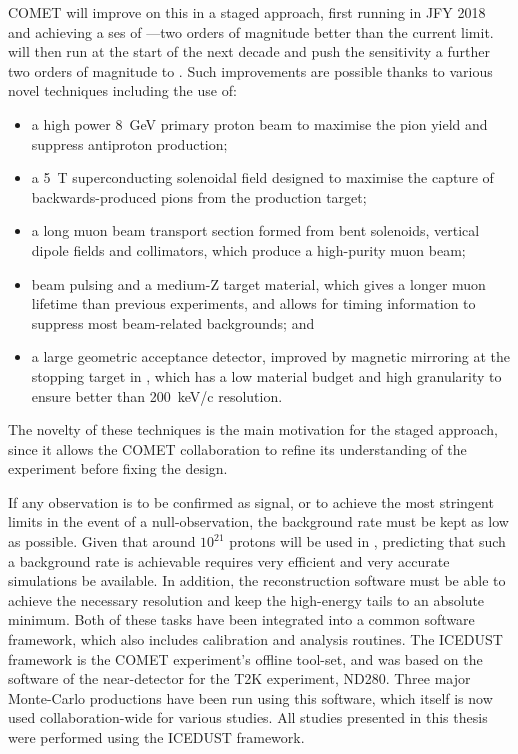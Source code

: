 COMET will improve on this in a staged approach, first running in \ac{JFY} 2018 and achieving a \ac{ses} of \sensePI---two orders of magnitude better than the current limit.
\phaseII will then run at the start of the next decade and push the sensitivity a further two orders of magnitude to \sensePII.
Such improvements are possible thanks to various novel techniques including the use of: 
\begin{itemize}
\item a high power 8~GeV primary proton beam to maximise the pion yield and suppress antiproton production;
\item a 5~T superconducting solenoidal field designed to maximise the capture of backwards-produced pions from the production target;
\item a long muon beam transport section formed from bent solenoids, vertical dipole fields and collimators, which produce a high-purity muon beam;
\item beam pulsing and a medium-Z target material, which gives a longer muon lifetime than previous experiments, and allows for timing information to suppress most beam-related backgrounds; and
\item a large geometric acceptance detector, improved by magnetic mirroring at the stopping target in \phaseII, which has a low material budget and high granularity to ensure better than 200~keV/c resolution.
\end{itemize}
The novelty of these techniques is the main motivation for the staged approach, since it allows the COMET collaboration to refine its understanding of the experiment before fixing the \phaseII design.

If any observation is to be confirmed as signal, or to achieve the most stringent limits in the event of a null-observation, the background rate must be kept as low as possible.
Given that around $10^{21}$ protons will be used in \phaseII, predicting that such a background rate is achievable requires very efficient and very accurate simulations be available.
In addition, the reconstruction software must be able to achieve the necessary resolution and keep the high-energy tails to an absolute minimum.
Both of these tasks have been integrated into a common software framework, which also includes calibration and analysis routines.
The ICEDUST framework is the COMET experiment's offline tool-set, and was based on the software of the near-detector for the T2K experiment, ND280.
Three major Monte-Carlo productions have been run using this software, which itself is now used collaboration-wide for various studies.
All studies presented in this thesis were performed using the ICEDUST framework.

